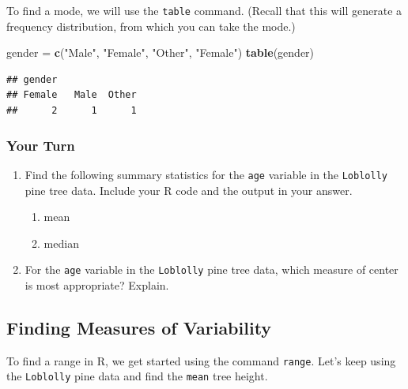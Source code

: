 \documentclass[
]{book}
\newenvironment{Shaded}{\begin{snugshade}}{\end{snugshade}}
\newcommand{\FunctionTok}[1]{\textcolor[rgb]{0.13,0.29,0.53}{\textbf{#1}}}
\newcommand{\NormalTok}[1]{#1}
\newcommand{\OtherTok}[1]{\textcolor[rgb]{0.56,0.35,0.01}{#1}}
\newcommand{\StringTok}[1]{\textcolor[rgb]{0.31,0.60,0.02}{#1}}
\providecommand{\tightlist}{%
  \setlength{\itemsep}{0pt}\setlength{\parskip}{0pt}}
\begin{document}
To find a mode, we will use the \texttt{table} command. (Recall that this will generate a frequency distribution, from which you can take the mode.)

\begin{Shaded}
\begin{Highlighting}[]
\NormalTok{gender }\OtherTok{=} \FunctionTok{c}\NormalTok{(}\StringTok{"Male"}\NormalTok{, }\StringTok{"Female"}\NormalTok{, }\StringTok{"Other"}\NormalTok{, }\StringTok{"Female"}\NormalTok{)}
\FunctionTok{table}\NormalTok{(gender)}
\end{Highlighting}
\end{Shaded}

\begin{verbatim}
## gender
## Female   Male  Other 
##      2      1      1
\end{verbatim}

\subsubsection*{Your Turn}\label{your-turn-6}

\begin{enumerate}
\def\labelenumi{\arabic{enumi}.}
\tightlist
\item
  Find the following summary statistics for the \texttt{age} variable in the \texttt{Loblolly} pine tree data. Include your R code and the output in your answer.

  \begin{enumerate}
  \def\labelenumii{\alph{enumii}.}
  \tightlist
  \item
    mean
  \item
    median
  \end{enumerate}
\item
  For the \texttt{age} variable in the \texttt{Loblolly} pine tree data, which measure of center is most appropriate? Explain.
\end{enumerate}

\subsection*{Finding Measures of Variability}\label{finding-measures-of-variability}

To find a range in R, we get started using the command \texttt{range}. Let's keep using the \texttt{Loblolly} pine data and find the \texttt{mean} tree height.
\end{document}
